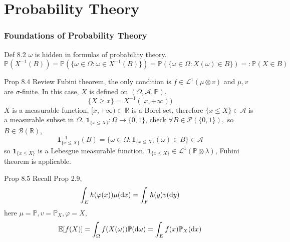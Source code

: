 \part{Probability Theory}
\setcounter{section}{7}
\section{Foundations of Probability Theory}

\begin{note}{Def 8.2}
$\omega$ is hidden in formulas of probability theory.
\[
\mathbb{P}(X^{-1}(B))=\mathbb{P}(\{\omega\in\Omega:\omega\in X^{-1}(B)\})=\mathbb{P}(\{\omega\in\Omega:X(\omega)\in B\})=:\mathbb{P}(X\in B)
\]
\end{note}

\begin{note}{Prop 8.4}
    Review Fubini theorem, the only condition is $f\in\mathcal{L}^1(\mu\otimes v)$ and $\mu,v$ are $\sigma$-finite. In this case, $X$ is defined on $(\Omega,\mathcal{A},\mathbb{P})$.
    \[
    \{X\ge x\}=X^{-1}([x,+\infty))
    \]
    $X$ is a measurable function, $[x,+\infty)\subset \mathbb{R}$ is a Borel set, therefore $\{x\le X\}\in\mathcal{A}$ is a measurable subset in $\Omega$. $\mathbf{1}_{\{x\le X\}}:\Omega\to\{0,1\}$, check $\forall B\in\mathcal{P}(\{0,1\}),$  so $B\in\mathcal{B}(\mathbb{R})$,
    \[
    \mathbf{1}_{\{x\le X\}}^{-1}(B)=\{\omega\in\Omega: \mathbf{1}_{\{x\le X\}}(\omega)\in B\}\in\mathcal{A}
    \]
    so $\mathbf{1}_{\{x\le X\}}$ is a Lebesgue measurable function. $\mathbf{1}_{\{x\le X\}}\in \mathcal{L}^1(\mathbb{P}\otimes \lambda)$, Fubini theorem is applicable.
\end{note}

\begin{note}{Prop 8.5}
    Recall Prop 2.9,
    \[
    \int_E h(\varphi(x))\mu(\mathop{}\!\mathrm{d} x)=\int_F h(y)v(\mathop{}\!\mathrm{d} y)
    \]
    here $\mu=\mathbb{P},v=\mathbb{P}_X,\varphi=X$,
    \[
    \mathbb{E}[f(X)]=\int_{\Omega}f(X(\omega))\mathbb{P}(\mathop{}\!\mathrm{d}\omega)=\int_E f(x)\mathbb{P}_X(\mathop{}\!\mathrm{d} x)
    \]
\end{note}

